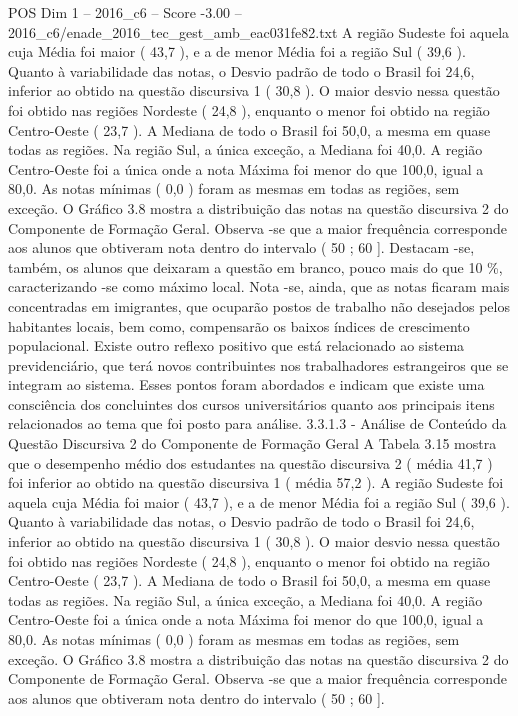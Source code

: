 \begin{textsample}{POS Dim 1 – 2016\_c6 – Score -3.00 – 2016\_c6/enade\_2016\_tec\_gest\_amb\_eac031fe82.txt}
A região Sudeste foi aquela cuja Média foi maior ( 43,7 ), e a de menor Média foi a região Sul ( 39,6 ).
Quanto à variabilidade das notas, o Desvio padrão de todo o Brasil foi 24,6, inferior ao obtido na questão discursiva 1 ( 30,8 ).
O maior desvio nessa questão foi obtido nas regiões Nordeste ( 24,8 ), enquanto o menor foi obtido na região Centro-Oeste ( 23,7 ).
A Mediana de todo o Brasil foi 50,0, a mesma em quase todas as regiões.
Na região Sul, a única exceção, a Mediana foi 40,0.
A região Centro-Oeste foi a única onde a nota Máxima foi menor do que 100,0, igual a 80,0.
As notas mínimas ( 0,0 ) foram as mesmas em todas as regiões, sem exceção.
O Gráfico 3.8 mostra a distribuição das notas na questão discursiva 2 do Componente de Formação Geral.
Observa -se que a maior frequência corresponde aos alunos que obtiveram nota dentro do intervalo ( 50 ; 60 ].
Destacam -se, também, os alunos que deixaram a questão em branco, pouco mais do que 10 \%, caracterizando -se como máximo local.
Nota -se, ainda, que as notas ficaram mais concentradas em imigrantes, que ocuparão postos de trabalho não desejados pelos habitantes locais, bem como, compensarão os baixos índices de crescimento populacional.
Existe outro reflexo positivo que está relacionado ao sistema previdenciário, que terá novos contribuintes nos trabalhadores estrangeiros que se integram ao sistema.
Esses pontos foram abordados e indicam que existe uma consciência dos concluintes dos cursos universitários quanto aos principais itens relacionados ao tema que foi posto para análise. 3.3.1.3 - Análise de Conteúdo da Questão Discursiva 2 do Componente de Formação Geral A Tabela 3.15 mostra que o desempenho médio dos estudantes na questão discursiva 2 ( média 41,7 ) foi inferior ao obtido na questão discursiva 1 ( média 57,2 ).
A região Sudeste foi aquela cuja Média foi maior ( 43,7 ), e a de menor Média foi a região Sul ( 39,6 ).
Quanto à variabilidade das notas, o Desvio padrão de todo o Brasil foi 24,6, inferior ao obtido na questão discursiva 1 ( 30,8 ).
O maior desvio nessa questão foi obtido nas regiões Nordeste ( 24,8 ), enquanto o menor foi obtido na região Centro-Oeste ( 23,7 ).
A Mediana de todo o Brasil foi 50,0, a mesma em quase todas as regiões.
Na região Sul, a única exceção, a Mediana foi 40,0.
A região Centro-Oeste foi a única onde a nota Máxima foi menor do que 100,0, igual a 80,0.
As notas mínimas ( 0,0 ) foram as mesmas em todas as regiões, sem exceção.
O Gráfico 3.8 mostra a distribuição das notas na questão discursiva 2 do Componente de Formação Geral.
Observa -se que a maior frequência corresponde aos alunos que obtiveram nota dentro do intervalo ( 50 ; 60 ].

\end{textsample}
